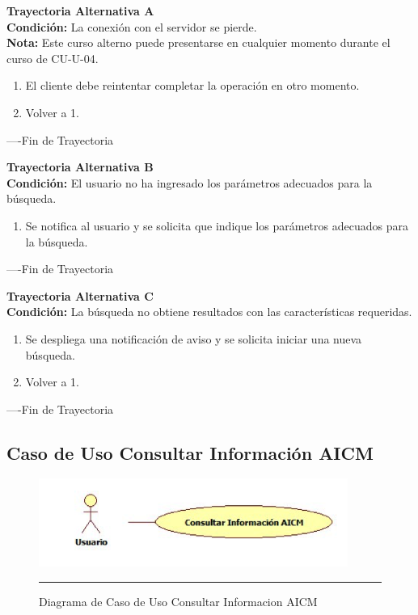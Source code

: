 \begin{flushleft}
	\hypertarget{TrayectoriaA_CU-U-04}{}
	\textbf{Trayectoria Alternativa A}\\
	\textbf{Condición:} La conexión con el servidor se pierde. \\
	\textbf{Nota: } Este curso alterno puede presentarse en cualquier momento durante el curso de CU-U-04. \\	
	\begin{enumerate}
		\item El cliente debe reintentar completar la operación en otro momento. 
		\item Volver a 1. 
	\end{enumerate}
\end{flushleft}
----Fin de Trayectoria

\begin{flushleft}
	\hypertarget{TrayectoriaB_CU-U-04}{}
	\textbf{Trayectoria Alternativa B}\\
	\textbf{Condición:} El usuario no ha ingresado los parámetros adecuados para la búsqueda. \\
	\begin{enumerate}
		\item  Se notifica al usuario y se solicita que indique los parámetros adecuados para la búsqueda.
	\end{enumerate}
\end{flushleft}
----Fin de Trayectoria

\begin{flushleft}
	\hypertarget{TrayectoriaC_CU-U-04}{}
	\textbf{Trayectoria Alternativa C}\\
	\textbf{Condición:} La búsqueda no obtiene resultados con las características requeridas. \\
	\begin{enumerate}
		\item Se despliega una notificación de aviso y se solicita iniciar una nueva búsqueda. 
		\item Volver a 1.
	\end{enumerate}
\end{flushleft}
----Fin de Trayectoria
\clearpage
\subsection{Caso de Uso Consultar Información AICM}

\begin{figure}[htbp]
	\centering
		\includegraphics[width=0.9\textwidth]{Figuras/cuConsultarInformacionAICM.png}
		\rule{30em}{0.5pt}
	\caption[Diagrama de Caso de Uso Consultar Informacion AICM]{Diagrama de Caso de Uso Consultar Informacion AICM}
	\label{fig:cuConsultarInformacionAICM}
\end{figure}

